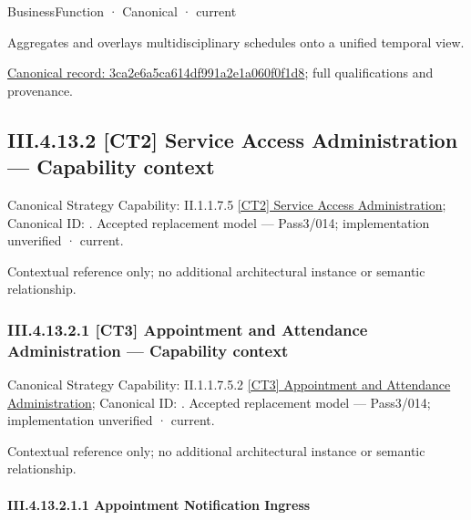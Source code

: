 \label{element:3ca2e6a5ca614df991a2e1a060f0f1d8}
{\small BusinessFunction · Canonical · current}\par

Aggregates and overlays multidisciplinary schedules onto a unified temporal view.


{\footnotesize \href{../../../../../../../../continuum/business/business-function/3ca2e6a5ca614df991a2e1a060f0f1d8.md}{Canonical record: 3ca2e6a5ca614df991a2e1a060f0f1d8}; full qualifications and provenance.}\par
\subsection*{III.4.13.2 [CT2] Service Access Administration — Capability context}
\label{navigation:III.4.13.2}

{\small Canonical Strategy Capability: II.1.1.7.5 \hyperref[element:ba82c985e20a4f9382e7e265a19e440e]{[CT2] Service Access Administration}; Canonical ID: \texttt{}. Accepted replacement model — Pass3/014; implementation unverified · current.}\par
Contextual reference only; no additional architectural instance or semantic relationship.\par
\subsubsection*{III.4.13.2.1 [CT3] Appointment and Attendance Administration — Capability context}
\label{navigation:III.4.13.2.1}

{\small Canonical Strategy Capability: II.1.1.7.5.2 \hyperref[element:cd330c1c71f14310a765d0cb46e6f208]{[CT3] Appointment and Attendance Administration}; Canonical ID: \texttt{}. Accepted replacement model — Pass3/014; implementation unverified · current.}\par
Contextual reference only; no additional architectural instance or semantic relationship.\par
\paragraph*{III.4.13.2.1.1 Appointment Notification Ingress}
\label{navigation:III.4.13.2.1.1}

